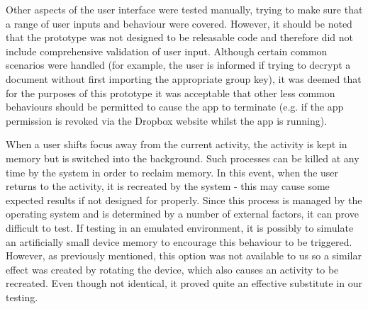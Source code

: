 Other aspects of the user interface were tested manually, trying to make sure that a range of user inputs and behaviour were covered.  However, it should be noted that the prototype was not designed to be releasable code and therefore did not include comprehensive validation of user input. Although certain common scenarios were handled (for example, the user is informed if trying to decrypt a document without first importing the appropriate group key), it was deemed that for the purposes of this prototype it was acceptable that other less common behaviours should be permitted to cause the app to terminate (e.g. if the app permission is revoked via the Dropbox website whilst the app is running).  

When a user shifts focus away from the current activity, the activity is kept in memory but is switched into the background.  Such processes can be killed at any time by the system in order to reclaim memory.  In this event, when the user returns to the activity, it is recreated by the system - this may cause some expected results if not designed for properly.  Since this process is managed by the operating system and is determined by a number of external factors, it can prove difficult to test.  If testing in an emulated environment, it is possibly to simulate an artificially small device memory to encourage this behaviour to be triggered.  However, as previously mentioned, this option was not available to us so a similar effect was created by rotating the device, which also causes an activity to be recreated.  Even though not identical, it proved quite an effective substitute in our testing.

